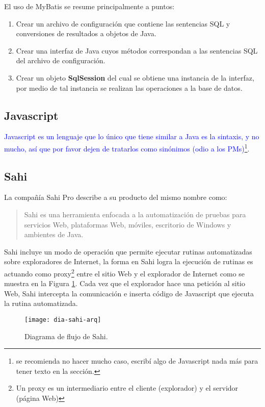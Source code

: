 El uso de MyBatis se resume principalmente a puntos\cite{PersistenceWithMyBatis}:
\begin{enumerate}
	\item Crear un archivo de configuración que contiene las sentencias SQL y conversiones de resultados a objetos de Java.
	\item Crear una interfaz de Java cuyos métodos correspondan a las sentencias SQL del archivo de configuración.
	\item Crear un objeto \textbf{SqlSession} del cual se obtiene una instancia de la interfaz, por medio de tal instancia se realizan las operaciones a la base de datos.
\end{enumerate}

\subsection{Javascript}\label{sec-javascript}
\textcolor{blue}{Javascript es un lenguaje que lo único que tiene similar a Java es la sintaxis, y no mucho, así que por favor dejen de tratarlos como sinónimos (odio a los PMs)}\footnote{se recomienda no hacer mucho caso, escribí algo de Javascript nada más para tener texto en la sección.}.


\subsection{Sahi}\label{sec-sahi}
La compañía Sahi Pro\textsuperscript{\textcopyright}\cite{SahiPro} describe a su producto del mismo nombre como:
\begin{quote}
	Sahi es una herramienta enfocada a la automatización de pruebas para servicios Web, plataformas Web, móviles, escritorio de Windows\textsuperscript{\textcopyright} y ambientes de Java.
\end{quote}

Sahi incluye un modo de operación que permite ejecutar rutinas automatizadas sobre exploradores de Internet, la forma en Sahi logra la ejecución de rutinas es actuando como proxy\footnote{Un proxy es un intermediario entre el cliente (explorador) y el servidor (página Web)\cite{BeginningUbuntuLinux}} entre el sitio Web y el explorador de Internet como se muestra en la Figura \ref{fig:dia-sahi-arq}. Cada vez que el explorador hace una petición al sitio Web, Sahi intercepta la comunicación e inserta código de Javascript que ejecuta la rutina automatizada.\cite{WebEng9IntConf, SahiPro}

\begin{figure}[h]
\centering
\texttt{[image: dia-sahi-arq]}
\caption{Diagrama de flujo de Sahi\cite{SahiPro}.}
\label{fig:dia-sahi-arq}
\end{figure}

